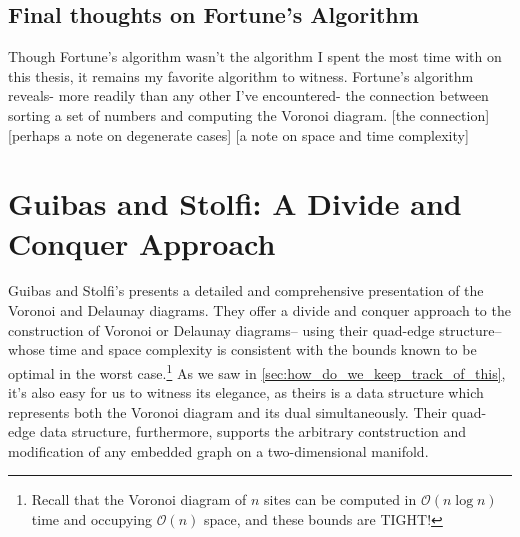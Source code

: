 \documentclass[12pt,twoside]{reedthesis}
\makeatletter
\let\OldStatex\Statex
\renewcommand{\Statex}[1][3]{%
  \setlength\@tempdima{\algorithmicindent}%
  \OldStatex\hskip\dimexpr#1\@tempdima\relax}
\makeatother
\begin{document}
    \begin{algorithm}[H]
    \end{algorithm}

    \begin{algorithm}[H]
    \end{algorithm}

  \subsection{Final thoughts on Fortune's Algorithm} %
  \label{sub:final_thoughts_on_fortune_s_algorithm}
    Though Fortune's algorithm wasn't the algorithm I spent the most time with on this thesis, it remains my favorite algorithm to witness. Fortune's algorithm reveals- more readily than any other I've encountered- the connection between sorting a set of numbers and computing the Voronoi diagram. [the connection]
    [perhaps a note on degenerate cases]
    [a note on space and time complexity] 

  \section{Guibas and Stolfi: A Divide and Conquer Approach} %
  \label{sec:divide_and_conquer}
    Guibas and Stolfi's  presents a detailed and comprehensive presentation of the Voronoi and Delaunay diagrams. They offer a divide and conquer approach to the construction of Voronoi or Delaunay diagrams-- using their quad-edge structure-- whose time and space complexity is consistent with the bounds known to be optimal in the worst case.\footnote{Recall that the Voronoi diagram of $n$ sites can be computed in $\mathcal{O}(n\log n)$ time and occupying $\mathcal{O}(n)$ space, and these bounds are TIGHT!} As we saw in \cref{sec:how_do_we_keep_track_of_this}, it's also easy for us to witness its elegance, as theirs is a data structure which represents both the Voronoi diagram and its dual simultaneously. Their quad-edge data structure, furthermore, supports the arbitrary contstruction and modification of any embedded graph on a two-dimensional manifold.
\end{document}
